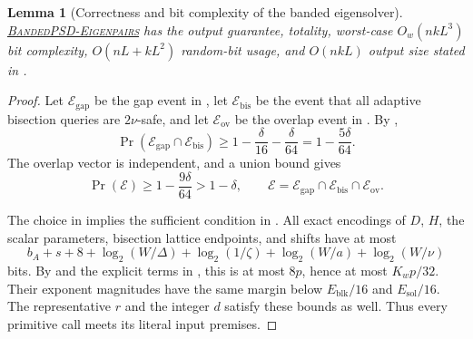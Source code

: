 \documentclass[11pt]{article}
\newtheorem{lemma}{Lemma}[section]
\newcommand{\BandedPSDEigenpairs}{%
  \textnormal{\textsc{BandedPSD-\hspace{0pt}Eigenpairs}}}
\begin{document}
\begin{lemma}[Correctness and bit complexity of the banded eigensolver]
\label{lem:main-algorithm}
\hyperref[alg:main]{\BandedPSDEigenpairs} has the output guarantee,
totality, worst-case $O_w(nkL^3)$ bit complexity,
$O(nL+kL^2)$ random-bit usage, and $O(nkL)$ output size stated in
.
\end{lemma}

\begin{proof}
Let $\mathcal E_{\mathrm{gap}}$ be the gap event in
, let $\mathcal E_{\mathrm{bis}}$ be the event that all
adaptive bisection queries are $2\nu$-safe, and let
$\mathcal E_{\mathrm{ov}}$ be the overlap event in
.  By ,
\begin{equation}
 \label{eq:filter-event-probability}
 \Pr(\mathcal E_{\mathrm{gap}}\cap\mathcal E_{\mathrm{bis}})
 \geq1-\frac\delta{16}-\frac\delta{64}
 =1-\frac{5\delta}{64}.
\end{equation}
The overlap vector is independent, and a union bound gives
\begin{equation}
 \label{eq:main-event-probability}
 \Pr(\mathcal E)\geq1-\frac{9\delta}{64}>1-\delta,
 \qquad
 \mathcal E=\mathcal E_{\mathrm{gap}}\cap
 \mathcal E_{\mathrm{bis}}\cap\mathcal E_{\mathrm{ov}}.
\end{equation}

The choice in  implies the sufficient condition in
.  All exact encodings of $D$, $H$, the scalar
parameters, bisection lattice endpoints, and shifts have at most
\[
 b_A+s+8+\log_2(W/\Delta)+\log_2(1/\zeta)
 +\log_2(W/a)+\log_2(W/\nu)
\]
bits.  By  and the explicit terms in
, this is at most $8p$, hence at most
$K_wp/32$.  Their exponent magnitudes have the same margin below
$E_{\mathrm{blk}}/16$ and $E_{\mathrm{sol}}/16$.  The representative $r$
and the integer $d$ satisfy these bounds as well.  Thus every primitive call
meets its literal input premises.


\end{proof}
\end{document}
